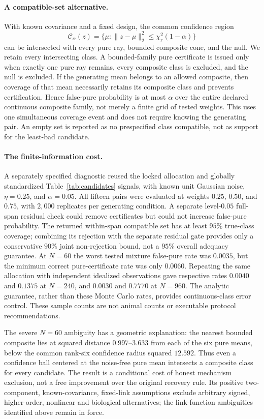 \paragraph{A compatible-set alternative.}
With known covariance and a fixed design, the common confidence region
\begin{equation}
 \mathcal C_\alpha(z)=
 \{\mu:\|z-\mu\|_2^2\leq\chi^2_r(1-\alpha)\}
\end{equation}
can be intersected with every pure ray, bounded composite cone, and the null.
We retain every intersecting class. A bounded-family pure certificate is issued
only when exactly one pure ray remains, every composite class is excluded, and
the null is excluded. If the generating mean belongs to an allowed composite,
then coverage of that mean necessarily retains its composite class and
prevents certification. Hence false-pure probability is at most $\alpha$
over the entire declared continuous composite family, not merely a finite
grid of tested weights. This uses one simultaneous coverage event and does not
require knowing the generating pair. An empty set is reported as no
prespecified class compatible, not as support for the least-bad candidate.

\paragraph{The finite-information cost.}
A separately specified diagnostic reused the locked allocation and globally
standardized Table~\ref{tab:candidates} signals, with known unit Gaussian
noise, $\eta=0.25$, and $\alpha=0.05$. All fifteen pairs were evaluated at
weights $0.25$, $0.50$, and $0.75$, with $2{,}000$ replicates per generating
condition. A separate level-$0.05$ full-span residual check could remove
certificates but could not increase false-pure probability. The returned
within-span compatible set has at least $95\%$ true-class coverage; combining
its rejection with the separate residual gate provides only a conservative
$90\%$ joint non-rejection bound, not a $95\%$ overall adequacy guarantee.
At $N=60$ the
worst tested mixture false-pure rate was $0.0035$, but the minimum correct
pure-certificate rate was only $0.0060$. Repeating the same allocation with
independent idealized observations gave respective rates $0.0040$ and
$0.1375$ at $N=240$, and $0.0030$ and $0.7770$ at $N=960$. The analytic
guarantee, rather than these Monte Carlo rates, provides continuous-class error
control. These sample counts are not animal counts or executable protocol
recommendations.

The severe $N=60$ ambiguity has a geometric explanation: the nearest bounded
composite lies at squared distance $0.997$--$3.633$ from each of the six pure
means, below the common rank-six confidence radius squared $12.592$.
Thus even a confidence ball centered at the noise-free pure mean intersects
a composite class for every candidate. The result is a conditional cost of
honest mechanism exclusion, not a free improvement over the original recovery
rule. Its positive two-component, known-covariance, fixed-link assumptions
exclude arbitrary signed, higher-order, nonlinear and biological alternatives;
the link-function ambiguities identified above remain in force.
